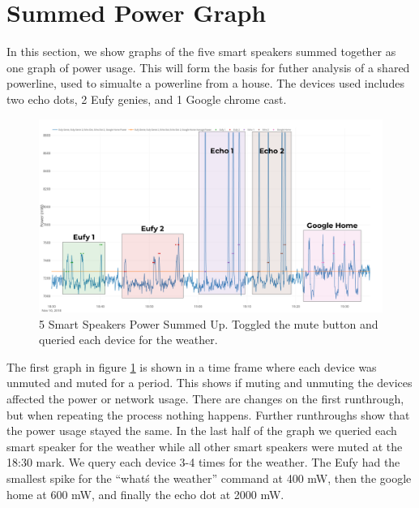 \section{Summed Power Graph}
\label{sumPowerGraph}
In this section, we show graphs of the five smart speakers summed together as one graph of power usage. This will form the basis for futher analysis of a shared powerline, used to simualte a powerline from a house. The devices used includes two echo dots, 2 Eufy genies, and 1 Google chrome cast.

\begin{figure}[H]
  \centering
  \includegraphics[width=1\textwidth]{figures/weatherSum.png}
  \caption{5 Smart Speakers Power Summed Up. Toggled the mute button and queried each device for the weather.}
  \label{fig:weatherSum}
\end{figure}

The first graph in figure \ref{fig:weatherSum} is shown in a time frame where each device was unmuted and muted for a period. This shows if muting and unmuting the devices affected the power or network usage. There are changes on the first runthrough, but when repeating the process nothing happens. Further runthroughs show that the power usage stayed the same. In the last half of the graph we queried each smart speaker for the weather while all other smart speakers were muted at the 18:30 mark. We query each device 3-4 times for the weather. The Eufy had the smallest spike for the ``what\'s the weather'' command at 400 mW, then the google home at 600 mW, and finally the echo dot at 2000 mW.

